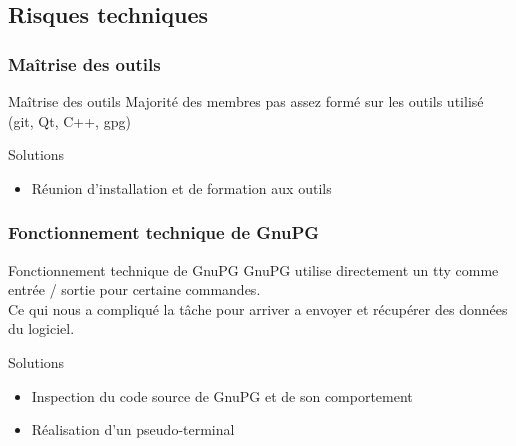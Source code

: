   \subsection{Risques techniques}
    \begin{frame}
      \frametitle{\color{white}Maîtrise des outils}
      \begin{block}{Maîtrise des outils}
        Majorité des membres pas assez formé sur les outils utilisé\\
        (git, Qt, C++, gpg)
      \end{block}
      \pause
      \begin{exampleblock}{Solutions}
        \begin{itemize}
          \item Réunion d'installation et de formation aux outils
        \end{itemize}
      \end{exampleblock}
    \end{frame}
    \begin{frame}
      \frametitle{\color{white}Fonctionnement technique de GnuPG}
      \begin{block}{Fonctionnement technique de GnuPG}
        GnuPG utilise directement un tty comme entrée / sortie pour certaine commandes.\\
        Ce qui nous a compliqué la tâche pour arriver a envoyer
        et récupérer des données du logiciel.
      \end{block}
      \pause
      \begin{exampleblock}{Solutions}
        \begin{itemize}
          \item Inspection du code source de GnuPG et de son comportement
          \item Réalisation d'un pseudo-terminal
        \end{itemize}
      \end{exampleblock}
    \end{frame}

